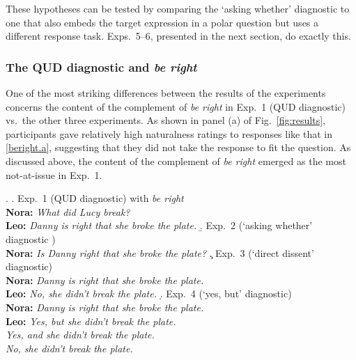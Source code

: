 \documentclass[times,linguex,xcolor]{glossa}
\begin{document}
      These hypotheses can be tested by comparing the `asking whether' diagnostic to one that also embeds the target expression in a polar question but uses a different response task. Exps.~5–6, presented in the next section, do exactly this.
      

    \subsubsection{The QUD diagnostic and \emph{be right}}
      One of the most striking differences between the results of the experiments concerns the content of the complement of \emph{be right} in Exp.~1 (QUD diagnostic) vs.\ the other three experiments. As shown in panel (a) of Fig.~\ref{fig:results}, participants gave relatively high naturalness ratings to responses like that in \ref{beright.a}, suggesting that they did not take the response to fit the question. As discussed above, the content of the complement of \emph{be right} emerged as the most not-at-issue in Exp.~1. 

      \ex.
      \a.\label{beright.a}  Exp.~1 (QUD diagnostic) with \emph{be right}
      \\ {\bf Nora:} \emph{What did Lucy break?}
      \\ {\bf Leo:} \emph{Danny is right that she broke the plate.}
      \b.\label{beright.b} Exp.~2 (`asking whether' diagnostic )
      \\ {\bf Nora:} \emph{Is Danny right that she broke the plate?}
      \c.\label{beright.c} Exp.~3 (`direct dissent' diagnostic)
      \\ {\bf Nora:} \emph{Danny is right that she broke the plate.}
      \\ {\bf Leo:} \emph{No, she didn't break the plate.}
      \d.\label{beright.d} Exp.~4 (`yes, but' diagnostic)
      \\ {\bf Nora:} \emph{Danny is right that she broke the plate.}
      \\ {\bf Leo:} \emph{Yes, but she didn't break the plate.}
      \\ \hspace*{1cm} \emph{Yes, and she didn't break the plate.}
      \\ \hspace*{1cm} \emph{No, she didn't break the plate.}
\end{document}
